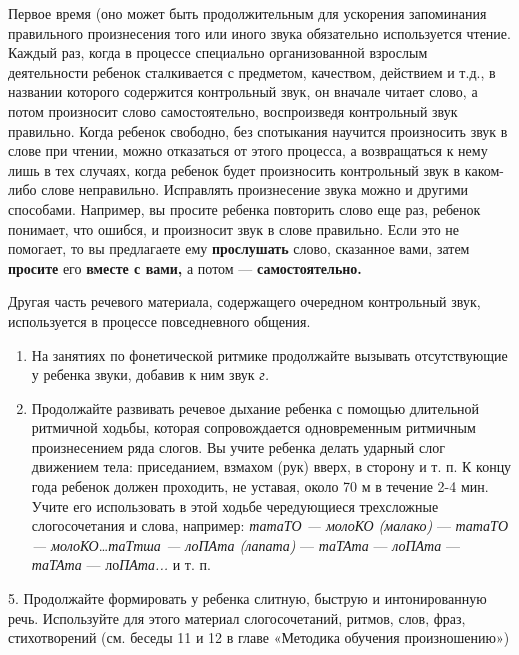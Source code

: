 \documentclass{book}
\renewcommand{\emph}[1]{\textit{#1}}
\begin{document}
Первое время (оно может быть продолжительным для ускорения запоминания
правильного произнесения того или иного звука обязательно используется
чтение. Каждый раз, когда в процессе специально организованной взрослым
деятельности ребенок сталкивается с предметом, качеством, действием и
т.д., в названии которого содержится контрольный звук, он вначале читает
слово, а потом произносит слово самостоятельно, воспроизведя контрольный
звук правильно. Когда ребенок свободно, без спотыкания научится
произносить звук в слове при чтении, можно отказаться от этого процесса,
а возвращаться к нему лишь в тех случаях, когда ребенок будет
произносить контрольный звук в каком-либо слове неправильно. Исправлять
произнесение звука можно и другими способами. Например, вы просите
ребенка повторить слово еще раз, ребенок понимает, что ошибся, и
произносит звук в слове правильно. Если это не помогает, то вы
предлагаете ему \textbf{прослушать} слово, сказанное вами, затем
\textbf{просите} его \textbf{вместе с вами,} а потом ---
\textbf{самостоятельно.}

Другая часть речевого материала, содержащего очередном контрольный звук,
используется в процессе повседневного общения.


\begin{enumerate}
\def\labelenumi{\arabic{enumi}.}
\setcounter{enumi}{2}
\item
  
  На занятиях по фонетической ритмике продолжайте вызывать отсутствующие
  у ребенка звуки, добавив к ним звук \emph{г.}
  
\item
  
  Продолжайте развивать речевое дыхание ребенка с помощью длительной
  ритмичной ходьбы, которая сопровождается одновременным ритмичным
  произнесением ряда слогов. Вы учите ребенка делать ударный слог
  движением тела: приседанием, взмахом (рук) вверх, в сторону и т. п. К
  концу года ребенок должен проходить, не уставая, около 70 м в течение
  2-4 мин. Учите его использовать в этой ходьбе чередующиеся трехсложные
  слогосочетания и слова, например: \emph{татаТО --- молоКО (малако)}
  --- \emph{татаТО --- молоКО}\ldots{}\emph{таТтша --- лоПАта (лапата)}
  --- \emph{таТАта} --- \emph{лоПАта} --- \emph{таТАта} ---
  ло\emph{ПАта...} и т. п.
  
\end{enumerate}


5. Продолжайте формировать у ребенка слитную, быструю и интонированную
речь. Используйте для этого материал слогосочетаний, ритмов, слов, фраз,
стихотворений (см. беседы 11 и 12 в главе «Методика обучения
произношению»)
\end{document}

